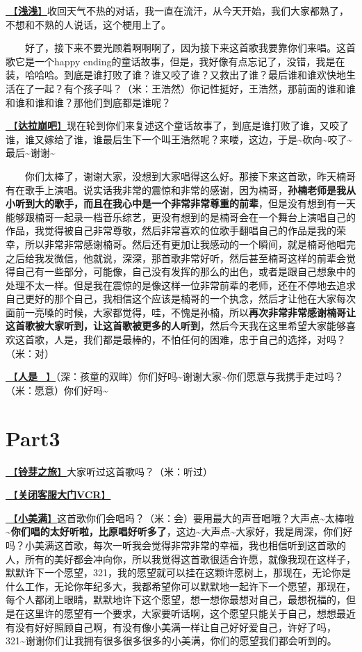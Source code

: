 \documentclass[]{ctexbook}
\begin{document}
\hyperref[qianqian]{🎵【\textbf{浅浅}】}收回天气不热的对话，我一直在流汗，从今天开始，我们大家都熟了，不想和不熟的人说话，这个梗用上了。

  好了，接下来不要光顾着啊啊啊了，因为接下来这首歌我要靠你们来唱。这首歌它是一个happy ending的童话故事，但是，我好像有点忘记了，没错，我是在装，哈哈哈。到底是谁打败了谁？谁又咬了谁？又救出了谁？最后谁和谁欢快地生活在了一起？有个孩子叫？（米：王浩然）你记性挺好，王浩然，那前面的谁和谁和谁和谁和谁？那他们到底都是谁呢？

\hyperref[dalabengba]{🎵【\textbf{达拉崩吧}】}现在轮到你们来复述这个童话故事了，到底是谁打败了谁，又咬了谁，谁又嫁给了谁，谁最后生下一个叫王浩然呢？来喽，这边，于是\textasciitilde 砍向\textasciitilde 咬了\textasciitilde 最后\textasciitilde 谢谢\textasciitilde{}

  你们太棒了，谢谢大家，没想到大家唱得这么好。那接下来这首歌，昨天楠哥有在歌手上演唱。说实话我非常的震惊和非常的感谢，因为楠哥，\textbf{孙楠老师是我从小听到大的歌手，而且在我心中是一个非常非常尊重的前辈}，但是没有想到有一天能够跟楠哥一起录一档音乐综艺，更没有想到的是楠哥会在一个舞台上演唱自己的作品，我觉得被自己非常尊敬，然后非常喜欢的位歌手翻唱自己的作品是我的荣幸，所以非常非常感谢楠哥。然后还有更加让我感动的一个瞬间，就是楠哥他唱完之后给我发微信，他就说，深深，那首歌非常好听，然后甚至楠哥这样的前辈会觉得自己有一些部分，可能像，自己没有发挥的那么的出色，或者是跟自己想象中的处理不太一样。但是我在震惊的是像这样一位非常前辈的老师，还在不停地去追求自己更好的那个自己，我相信这个应该是楠哥的一个执念，然后才让他在大家每次面前一亮嗓的时候，大家都觉得，哇，不愧是孙楠，所以\textbf{再次非常非常感谢楠哥让这首歌被大家听到，让这首歌被更多的人听到}，然后今天我在这里希望大家能够喜欢这首歌，人是，我们都是最棒的，不怕任何的困难，忠于自己的选择，对吗？（米：对）

\hyperref[renshi]{🎵【\textbf{人是\_}】}（深：孩童的双眸）你们好吗\textasciitilde 谢谢大家\textasciitilde 你们愿意与我携手走过吗？（米：愿意）你们好吗\textasciitilde{}

\section{Part3}\label{chengdu-20240615-part3}

\hyperref[travel-lingya]{🎵【\textbf{铃芽之旅}】}大家听过这首歌吗？（米：听过）

\hyperref[close-door-vcr]{🎥【\textbf{关闭客服大门VCR}】}

\hyperref[happy-ending]{🎵【\textbf{小美满}】}这首歌你们会唱吗？（米：会）要用最大的声音唱哦？大声点\textasciitilde 太棒啦\textasciitilde{}\textbf{你们唱的太好听啦，比原唱好听多了}，这边\textasciitilde 大声点\textasciitilde 大家好，我是周深，你们好吗？小美满这首歌，每次一听我会觉得非常非常的幸福，我也相信听到这首歌的人，所有的美好都会冲向你，所以我觉得这首歌很适合许愿，就像我现在这样子，默默许下一个愿望，321，我的愿望就可以挂在这颗许愿树上，那现在，无论你是什么工作，无论你年纪多大，我都希望你可以默默地一起许下一个愿望，那现在，每个人都闭上眼睛，默默地许下这个愿望，想一想你最想对自己，最想祝福的，但是在这里许的愿望有一个要求，大家要听话啊，这个愿望只能关于自己，想想最近有没有好好照顾自己啊，有没有像小美满一样让自己好好爱自己，许好了吗，321\textasciitilde 谢谢你们让我拥有很多很多很多的小美满，你们的愿望我们都会听到的。
\end{document}
